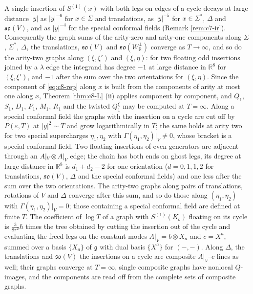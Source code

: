 \begin{proposition}
\label{prop:c8-Tsafe}
A single insertion of $S^{(1)}(x)$ with both legs on edges of a cycle decays at large distance $|y|$ as $|y|^{-6}$ for $x\in\Sigma$ and translations, as $|y|^{-5}$ for $x\in\Sigma^*$, $\Delta$ and $\mathfrak{so}(V)$, and as $|y|^{-4}$ for the special conformal fields (Remark \ref{rem:c7-ir}). Consequently the graph sums of the arity-zero and arity-one components along $\Sigma$, $\Sigma^*$, $\Delta$, the translations, $\mathfrak{so}(V)$ and $\mathfrak{so}(W_{\mathbb R}^\perp)$ converge as $T\to\infty$, and so do the arity-two graphs along $(\xi,\xi')$ and $(\xi,\eta)$: for two floating odd insertions joined by a $\lambda$ edge the integrand has degree $-1$ at large distance in $\mathbb R^8$ for $(\xi,\xi')$, and $-1$ after the sum over the two orientations for $(\xi,\eta)$. Since the component of \eqref{eq:c8-rep} along $x$ is built from the components of arity at most one along $x$, Theorem \ref{thm:c8-L} (ii) applies component by component, and $Q_1$, $S_1$, $D_1$, $P_1$, $M_1$, $R_1$ and the twisted $Q^\xi_1$ may be computed at $T=\infty$. Along a special conformal field the graphs with the insertion on a cycle are cut off by $P(\varepsilon,T)$ at $|y|^2\sim T$ and grow logarithmically in $T$; the same holds at arity two for two special supercharges $\eta_1,\eta_2$ with $\Gamma(\eta_1,\eta_2)|_V\neq0$, whose bracket is a special conformal field. Two floating insertions of even generators are adjacent through an $A|_V\otimes A|_V$ edge; the chain has both ends on ghost legs, its degree at large distance in $\mathbb R^8$ is $d_1+d_2-2$ for one orientation ($d=0,1,1,2$ for translations, $\mathfrak{so}(V)$, $\Delta$ and the special conformal fields) and one less after the sum over the two orientations. The arity-two graphs along pairs of translations, rotations of $V$ and $\Delta$ converge after this sum, and so do those along $(\eta_1,\eta_2)$ with $\Gamma(\eta_1,\eta_2)|_V=0$; those containing a special conformal field are defined at finite $T$. The coefficient of $\log T$ of a graph with $S^{(1)}(K_b)$ floating on its cycle is $\tfrac{3}{8\pi^2}\hbar$ times the tree obtained by cutting the insertion out of the cycle and evaluating the freed legs on the constant modes $A|_V=b\otimes X_a$ and $c=X^a$, summed over a basis $\{X_a\}$ of $\mathfrak g$ with dual basis $\{X^a\}$ for $(-,-)$. Along $\Delta$, the translations and $\mathfrak{so}(V)$ the insertions on a cycle are composite $A|_V$--$c$ lines as well; their graphs converge at $T=\infty$, single composite graphs have nonlocal $Q$-images, and the components are read off from the complete sets of composite graphs.
\end{proposition}

